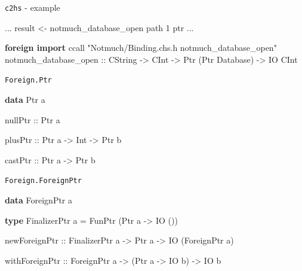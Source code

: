 \documentclass[ignorenonframetext,aspectratio=169]{beamer}
\newenvironment{Shaded}{}{}
\newcommand{\KeywordTok}[1]{\textcolor[rgb]{0.00,0.44,0.13}{\textbf{{#1}}}}
\newcommand{\DataTypeTok}[1]{\textcolor[rgb]{0.56,0.13,0.00}{{#1}}}
\newcommand{\DecValTok}[1]{\textcolor[rgb]{0.25,0.63,0.44}{{#1}}}
\newcommand{\StringTok}[1]{\textcolor[rgb]{0.25,0.44,0.63}{{#1}}}
\newcommand{\OtherTok}[1]{\textcolor[rgb]{0.00,0.44,0.13}{{#1}}}
\newcommand{\FunctionTok}[1]{\textcolor[rgb]{0.02,0.16,0.49}{{#1}}}
\newcommand{\NormalTok}[1]{{#1}}
\begin{document}
\begin{frame}[fragile]{\texttt{c2hs} - example}

\begin{Shaded}
\begin{Highlighting}[]
...
  \NormalTok{result }\OtherTok{<-} \NormalTok{notmuch_database_open} \NormalTok{path \DecValTok{1} ptr}
  ...

\KeywordTok{foreign import} \NormalTok{ccall} \StringTok{"Notmuch/Binding.chs.h notmuch_database_open"}
  \NormalTok{notmuch_database_open}
\OtherTok{    ::} \DataTypeTok{CString} \OtherTok{->} \DataTypeTok{CInt} \OtherTok{->} \DataTypeTok{Ptr} \NormalTok{(}\DataTypeTok{Ptr} \DataTypeTok{Database}\NormalTok{) }\OtherTok{->} \DataTypeTok{IO} \DataTypeTok{CInt}
\end{Highlighting}
\end{Shaded}

\end{frame}

\begin{frame}[fragile]{\texttt{Foreign.Ptr}}

\begin{Shaded}
\begin{Highlighting}[]
\KeywordTok{data} \DataTypeTok{Ptr} \NormalTok{a}

\OtherTok{nullPtr ::} \DataTypeTok{Ptr} \NormalTok{a}

\OtherTok{plusPtr ::} \DataTypeTok{Ptr} \NormalTok{a }\OtherTok{->} \DataTypeTok{Int} \OtherTok{->} \DataTypeTok{Ptr} \NormalTok{b}

\OtherTok{castPtr ::} \DataTypeTok{Ptr} \NormalTok{a }\OtherTok{->} \DataTypeTok{Ptr} \NormalTok{b}
\end{Highlighting}
\end{Shaded}

\end{frame}

\begin{frame}[fragile]{\texttt{Foreign.ForeignPtr}}

\begin{Shaded}
\begin{Highlighting}[]
\KeywordTok{data} \DataTypeTok{ForeignPtr} \NormalTok{a}

\KeywordTok{type} \DataTypeTok{FinalizerPtr} \NormalTok{a }\FunctionTok{=} \DataTypeTok{FunPtr} \NormalTok{(}\DataTypeTok{Ptr} \NormalTok{a }\OtherTok{->} \DataTypeTok{IO} \NormalTok{())}

\OtherTok{newForeignPtr ::} \DataTypeTok{FinalizerPtr} \NormalTok{a }\OtherTok{->} \DataTypeTok{Ptr} \NormalTok{a }\OtherTok{->} \DataTypeTok{IO} \NormalTok{(}\DataTypeTok{ForeignPtr} \NormalTok{a)}

\OtherTok{withForeignPtr ::} \DataTypeTok{ForeignPtr} \NormalTok{a }\OtherTok{->} \NormalTok{(}\DataTypeTok{Ptr} \NormalTok{a }\OtherTok{->} \DataTypeTok{IO} \NormalTok{b) }\OtherTok{->} \DataTypeTok{IO} \NormalTok{b}
\end{Highlighting}
\end{Shaded}

\end{frame}
\end{document}

